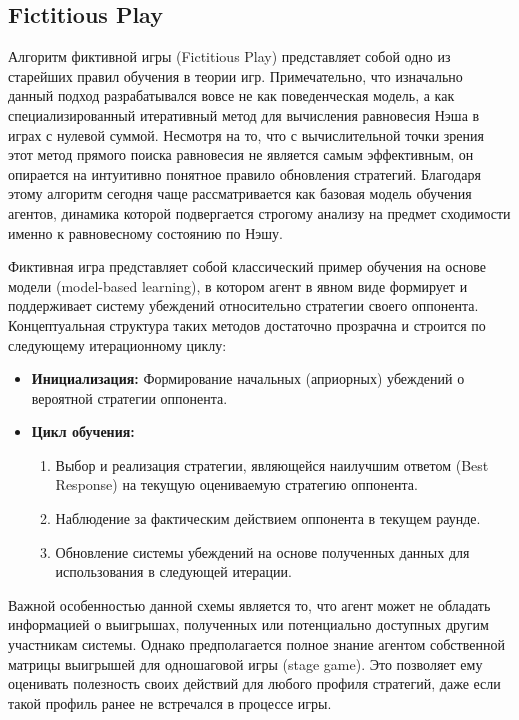 \subsection{Fictitious Play}

Алгоритм фиктивной игры (Fictitious Play) представляет собой одно из старейших правил обучения в теории игр. Примечательно, что изначально данный подход разрабатывался вовсе не как поведенческая модель, а как специализированный итеративный метод для вычисления равновесия Нэша в играх с нулевой суммой. Несмотря на то, что с вычислительной точки зрения этот метод прямого поиска равновесия не является самым эффективным, он опирается на интуитивно понятное правило обновления стратегий. Благодаря этому алгоритм сегодня чаще рассматривается как базовая модель обучения агентов, динамика которой подвергается строгому анализу на предмет сходимости именно к равновесному состоянию по Нэшу.

Фиктивная игра представляет собой классический пример обучения на основе модели (model-based learning), в котором агент в явном виде формирует и поддерживает систему убеждений относительно стратегии своего оппонента. Концептуальная структура таких методов достаточно прозрачна и строится по следующему итерационному циклу:

\begin{itemize}
    \item \textbf{Инициализация:} Формирование начальных (априорных) убеждений о вероятной стратегии оппонента.
    \item \textbf{Цикл обучения:}
    \begin{enumerate}
        \item Выбор и реализация стратегии, являющейся наилучшим ответом (Best Response) на текущую оцениваемую стратегию оппонента.
        \item Наблюдение за фактическим действием оппонента в текущем раунде.
        \item Обновление системы убеждений на основе полученных данных для использования в следующей итерации.
    \end{enumerate}
\end{itemize}

Важной особенностью данной схемы является то, что агент может не обладать информацией о выигрышах, полученных или потенциально доступных другим участникам системы. Однако предполагается полное знание агентом собственной матрицы выигрышей для одношаговой игры (stage game). Это позволяет ему оценивать полезность своих действий для любого профиля стратегий, даже если такой профиль ранее не встречался в процессе игры.

